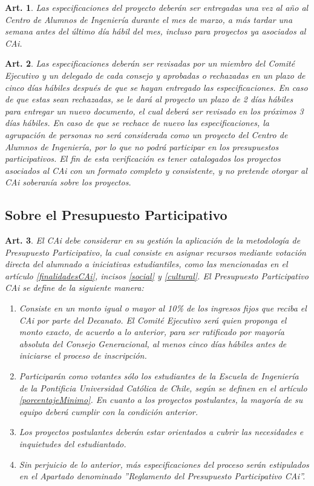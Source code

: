 \documentclass[letterpaper,11pt]{article}
\theoremstyle{plain}
\newtheorem{art}{Art.} %
\begin{document}
			\begin{art}
				Las especificaciones del proyecto deberán ser entregadas una vez al año al Centro de Alumnos de Ingeniería durante el mes de marzo, a más tardar una semana antes del último día hábil del mes, incluso para proyectos ya asociados al CAi.
			\end{art}

			\begin{art}
				Las especificaciones deberán ser revisadas por un miembro del Comité Ejecutivo y un delegado de cada consejo y aprobadas o rechazadas en un plazo de cinco días hábiles después de que se hayan entregado las especificaciones. En caso de que estas sean rechazadas, se le dará al proyecto un plazo de 2 días hábiles para entregar un nuevo documento, el cual deberá ser revisado en los próximos 3 días hábiles. En caso de que se rechace de nuevo las especificaciones, la agrupación de personas no será considerada como un proyecto del Centro de Alumnos de Ingeniería, por lo que no podrá participar en los presupuestos participativos. El fin de esta verificación es tener catalogados los proyectos asociados al CAi con un formato completo y consistente, y no pretende otorgar al CAi soberanía sobre los proyectos.
			\end{art}
		

		\subsection*{Sobre el Presupuesto Participativo}

			\begin{art}\label{definicionPParticipativo1}
				El CAi debe considerar en su gestión la aplicación de la metodología de Presupuesto Participativo, la cual consiste en asignar recursos mediante votación directa del alumnado a iniciativas estudiantiles, como las mencionadas en el artículo \ref{finalidadesCAi}, incisos \ref{social} y \ref{cultural}. El Presupuesto Participativo CAi se define de la siguiente manera:
				\begin{enumerate}
					\item Consiste en un monto igual o mayor al 10\% de los ingresos fijos que reciba el CAi por parte del Decanato. El Comité Ejecutivo será quien proponga el monto exacto, de acuerdo a lo anterior, para ser ratificado por mayoría absoluta del Consejo Generacional, al menos cinco días hábiles antes de iniciarse el proceso de inscripción.
					\item Participarán como votantes sólo los estudiantes de la Escuela de Ingeniería de la Pontificia Universidad Católica de Chile, según se definen en el artículo \ref{porcentajeMinimo}. En cuanto a los proyectos postulantes, la mayoría de su equipo deberá cumplir con la condición anterior.
					\item Los proyectos postulantes deberán estar orientados a cubrir las necesidades e inquietudes del estudiantado.
					\item Sin perjuicio de lo anterior, más especificaciones del proceso serán estipulados en el Apartado denominado \textit{''Reglamento del Presupuesto Participativo CAi''}.
				\end{enumerate}
			\end{art}
\end{document}
